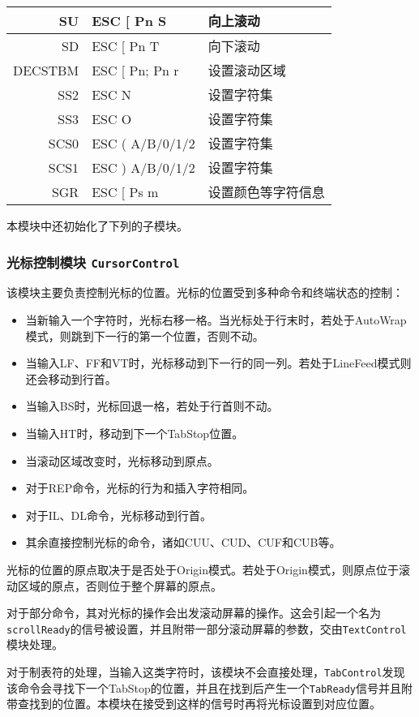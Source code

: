 \begin{longtable}{|r|l|l|}
SU & ESC [ Pn S &向上滚动 \\ \hline
SD & ESC [ Pn T &向下滚动 \\ \hline
DECSTBM & ESC [ Pn; Pn r &设置滚动区域 \\ \hline \hline

SS2 & ESC N&设置字符集 \\ \hline
SS3 & ESC O&设置字符集 \\ \hline
SCS0 & ESC ( A/B/0/1/2 & 设置字符集 \\ \hline
SCS1 & ESC ) A/B/0/1/2 &设置字符集 \\ \hline \hline

SGR & ESC [ Ps m &设置颜色等字符信息 \\ \hline
\end{longtable}

本模块中还初始化了下列的子模块。

\subsubsection{光标控制模块 \texttt{CursorControl}}
该模块主要负责控制光标的位置。光标的位置受到多种命令和终端状态的控制：

\begin{itemize}
	\item 当新输入一个字符时，光标右移一格。当光标处于行末时，若处于AutoWrap模式，则跳到下一行的第一个位置，否则不动。
	\item 当输入LF、FF和VT时，光标移动到下一行的同一列。若处于LineFeed模式则还会移动到行首。
	\item 当输入BS时，光标回退一格，若处于行首则不动。
	\item 当输入HT时，移动到下一个TabStop位置。
	\item 当滚动区域改变时，光标移动到原点。
	\item 对于REP命令，光标的行为和插入字符相同。
	\item 对于IL、DL命令，光标移动到行首。
	\item 其余直接控制光标的命令，诸如CUU、CUD、CUF和CUB等。
\end{itemize}

光标的位置的原点取决于是否处于Origin模式。若处于Origin模式，则原点位于滚动区域的原点，否则位于整个屏幕的原点。

对于部分命令，其对光标的操作会出发滚动屏幕的操作。这会引起一个名为\texttt{scrollReady}的信号被设置，并且附带一部分滚动屏幕的参数，交由\texttt{TextControl}模块处理。

对于制表符的处理，当输入这类字符时，该模块不会直接处理，\texttt{TabControl}发现该命令会寻找下一个TabStop的位置，并且在找到后产生一个\texttt{TabReady}信号并且附带查找到的位置。本模块在接受到这样的信号时再将光标设置到对应位置。

